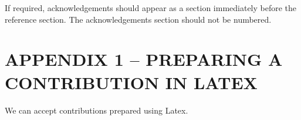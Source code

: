 \documentclass[aps,prb,twocolumn,superscriptaddress,floatfix,longbibliography]{revtex4-2}
\newcounter{para}
\begin{document}
If required, acknowledgements  should appear as a section
immediately before the reference section.
The acknowledgements section should not be numbered.


\section*{APPENDIX 1 -- PREPARING A CONTRIBUTION IN LATEX}

We can accept contributions prepared using Latex.





\end{document}
